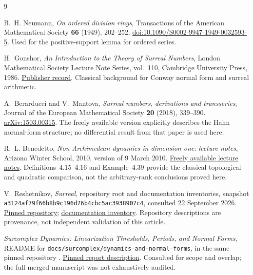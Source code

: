 \documentclass[11pt,a4paper]{article}
\numberwithin{equation}{section}
\theoremstyle{plain}
\theoremstyle{definition}
\theoremstyle{remark}
\begin{document}
\begin{thebibliography}{9}

B.~H. Neumann,
\emph{On ordered division rings},
Transactions of the American Mathematical Society \textbf{66} (1949),
202--252.
\href{https://doi.org/10.1090/S0002-9947-1949-0032593-5}{doi:10.1090/S0002-9947-1949-0032593-5}.
Used for the positive-support lemma for ordered series.

H.~Gonshor,
\emph{An Introduction to the Theory of Surreal Numbers},
London Mathematical Society Lecture Note Series, vol.~110,
Cambridge University Press, 1986.
\href{https://www.cambridge.org/core/books/an-introduction-to-the-theory-of-surreal-numbers/312AE504A3E88E804054BFB390446374}{Publisher record}.
Classical background for Conway normal form and surreal arithmetic.

A.~Berarducci and V.~Mantova,
\emph{Surreal numbers, derivations and transseries},
Journal of the European Mathematical Society \textbf{20} (2018),
339--390.
\href{https://arxiv.org/abs/1503.00315}{arXiv:1503.00315}.
The freely available version explicitly describes the Hahn normal-form
structure; no differential result from that paper is used here.

R.~L. Benedetto,
\emph{Non-Archimedean dynamics in dimension one: lecture notes},
Arizona Winter School, 2010, version of 9 March 2010.
\href{https://swc-math.github.io/aws/2010/2010BenedettoNotes-09Mar.pdf}{Freely available lecture notes}.
Definitions~4.15--4.16 and Example~4.39 provide the classical topological
and quadratic comparison, not the arbitrary-rank conclusions proved here.

V.~Reshetnikov,
\emph{Surreal}, repository root and documentation inventories,
snapshot \texttt{a3124af79f66b8b9c196d76b4cbc5ac3938907c4},
consulted 22 September 2026.
\href{https://github.com/VladimirReshetnikov/Surreal/tree/a3124af79f66b8b9c196d76b4cbc5ac3938907c4}{Pinned repository};
\href{https://github.com/VladimirReshetnikov/Surreal/blob/a3124af79f66b8b9c196d76b4cbc5ac3938907c4/docs/README.md}{documentation inventory}.
Repository descriptions are provenance, not independent validation of
this article.

\emph{Surcomplex Dynamics: Linearization Thresholds, Periods, and Normal Forms},
README for \texttt{docs/surcomplex/dynamics-and-normal-forms},
in the same pinned repository \cite{Repo}.
\href{https://github.com/VladimirReshetnikov/Surreal/blob/a3124af79f66b8b9c196d76b4cbc5ac3938907c4/docs/surcomplex/dynamics-and-normal-forms/README.md}{Pinned report description}.
Consulted for scope and overlap; the full merged manuscript was not
exhaustively audited.

\end{thebibliography}
\end{document}
